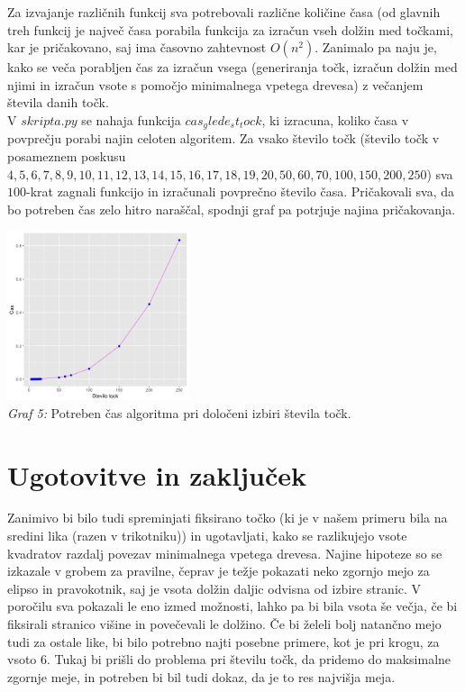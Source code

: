 \documentclass[a4paper]{report}
\begin{document}
Za izvajanje različnih funkcij sva potrebovali različne količine časa (od glavnih treh funkcij je največ časa porabila funkcija za izračun vseh dolžin med točkami, kar je pričakovano, saj ima časovno zahtevnost $O(n^2)$. Zanimalo pa naju je, kako se veča porabljen čas za izračun vsega (generiranja točk, izračun dolžin med njimi in izračun vsote s pomočjo minimalnega vpetega drevesa) z večanjem števila danih točk. \\
V \colorbox{gray!10}{$skripta.py$} se nahaja funkcija $cas_glede_st_tock$, ki izracuna, koliko časa v povprečju porabi najin celoten algoritem. Za vsako število točk (število točk v posameznem poskusu $4, 5, 6, 7, 8, 9, 10, 11, 12, 13, 14, 15, 16, 17, 18, 19, 20, 50, 60, 70, 100, 150, 200, 250$) sva $100$-krat zagnali funkcijo in izračunali povprečno število časa. Pričakovali sva, da bo potreben čas zelo hitro naraščal, spodnji graf pa potrjuje najina pričakovanja.
\begin{center}
\includegraphics[width=0.4\textwidth]{graf_cas} \\
\scriptsize{\textit{Graf 5: }  Potreben čas algoritma pri določeni izbiri števila točk.}
\end{center}
\section{Ugotovitve in zaključek}

Zanimivo bi bilo tudi spreminjati fiksirano točko (ki je v našem primeru bila na sredini lika (razen v trikotniku)) in ugotavljati, kako se razlikujejo vsote kvadratov razdalj povezav minimalnega vpetega drevesa. 
Najine hipoteze so se izkazale v grobem za pravilne, čeprav je težje pokazati neko zgornjo mejo za elipso in pravokotnik, saj je vsota dolžin daljic odvisna od izbire stranic. V poročilu sva pokazali le eno izmed možnosti, lahko pa bi bila vsota še večja, če bi fiksirali stranico višine in povečevali le dolžino. Če bi želeli bolj natančno mejo tudi za ostale like, bi bilo potrebno najti posebne primere, kot je pri krogu, za vsoto 6. Tukaj bi prišli do problema pri številu točk, da pridemo do maksimalne zgornje meje, in potreben bi bil tudi dokaz, da je to res najvišja meja. 
\\
\end{document}

